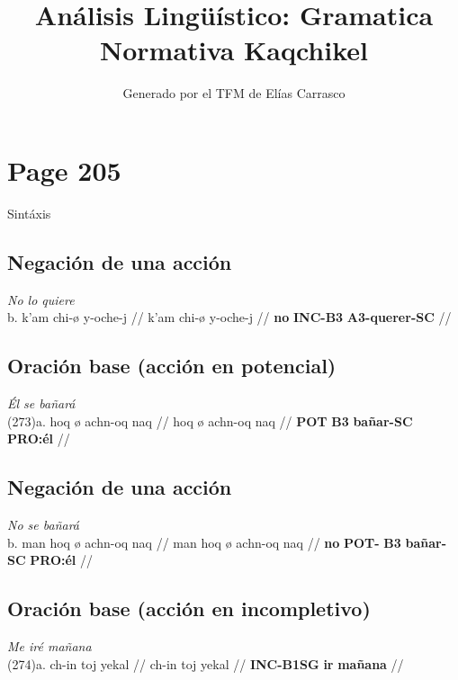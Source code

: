 \documentclass{article}%
\title{Análisis Lingüístico: Gramatica Normativa Kaqchikel}%
\author{Generado por el TFM de Elías Carrasco}%
\begin{document}
%
\normalsize%
\maketitle%
\section{Page 205}%
\label{sec:Page205}%
Sintáxis %
\subsection{Negación de una acción}%
\label{subsec:Negacindeunaaccin}%

%
\par\medskip%
\ex
\textit{No lo quiere} \\
\begingl
\gla b. k’am chi-ø y-oche-j //
\glb k’am chi-ø y-oche-j //
\glc \textbf{no} \textbf{INC-}\textbf{B3} \textbf{A3-}\textbf{querer-}\textbf{SC} //
\endgl
\xe
%
\medskip%
\subsection{Oración base (acción en potencial)}%
\label{subsec:Oracinbase(accinenpotencial)}%

%
\par\medskip%
\ex
\textit{Él se bañará} \\
\begingl
\gla (273)a. hoq ø achn-oq naq //
\glb hoq ø achn-oq naq //
\glc \textbf{POT} \textbf{B3} \textbf{bañar-}\textbf{SC} \textbf{PRO:él} //
\endgl
\xe
%
\medskip%
\subsection{Negación de una acción}%
\label{subsec:Negacindeunaaccin}%

%
\par\medskip%
\ex
\textit{No se bañará} \\
\begingl
\gla b. man hoq ø achn-oq naq //
\glb man hoq ø achn-oq naq //
\glc \textbf{no} \textbf{POT-} \textbf{B3} \textbf{bañar-}\textbf{SC} \textbf{PRO:él} //
\endgl
\xe
%
\medskip%
\subsection{Oración base (acción en incompletivo)}%
\label{subsec:Oracinbase(accinenincompletivo)}%

%
\par\medskip%
\ex
\textit{Me iré mañana} \\
\begingl
\gla (274)a. ch-in toj yekal //
\glb ch-in toj yekal //
\glc \textbf{INC-}\textbf{B1SG} \textbf{ir} \textbf{mañana} //
\endgl
\xe
%
\medskip%
\end{document}
